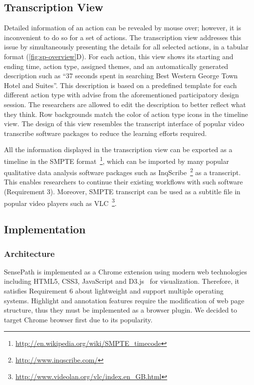 \subsection{Transcription View}
Detailed information of an action can be revealed by mouse over; however, it is inconvenient to do so for a set of actions. The transcription view addresses this issue by simultaneously presenting the details for all selected actions, in a tabular format (\autoref{fig:sp-overview}D). For each action, this view shows its starting and ending time, action type, assigned themes, and an automatically generated description such as ``37 seconds spent in searching Best Western George Town Hotel and Suites''. This description is based on a predefined template for each different action type with advise from the aforementioned participatory design session. The researchers are allowed to edit the description to better reflect what they think. Row backgrounds match the color of action type icons in the timeline view. The design of this view resembles the transcript interface of popular video transcribe software packages to reduce the learning efforts required.

All the information displayed in the transcription view can be exported as a timeline in the SMPTE format~\footnote{ \url{http://en.wikipedia.org/wiki/SMPTE_timecode}}, which can be imported by many popular qualitative data analysis software packages such as InqScribe~\footnote{\url{http://www.inqscribe.com/}} as a transcript. This enables researchers to continue their existing workflows with such software (Requirement 3). Moreover, SMPTE transcript can be used as a subtitle file in popular video players such as VLC~\footnote{\url{http://www.videolan.org/vlc/index.en_GB.html}}.

\subsection{Implementation}
\label{sub:sp-impl}
\subsubsection{Architecture}
SensePath is implemented as a Chrome extension using modern web technologies including HTML5, CSS3, JavaScript and D3.js~\cite{Bostock2011} for visualization. Therefore, it satisfies Requirement 6 about lightweight and support multiple operating systems. Highlight and annotation features require the modification of web page structure, thus they must be implemented as a browser plugin. We decided to target Chrome browser first due to its popularity.

